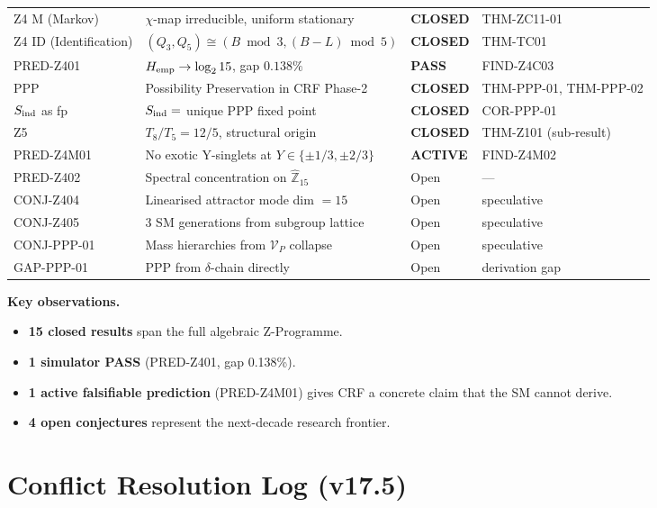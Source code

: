 \documentclass[12pt, a4paper]{article}
\begin{document}
\begin{keybox}[title={Master Z-Programme Status Table v17.5 (canonical)}]
{\begin{longtable}{p{2.6cm} p{6.0cm} p{1.6cm} p{3.2cm}}
Z4 M (Markov) & $\chi$-map irreducible, uniform stationary
   & \textbf{CLOSED} & THM-ZC11-01 \\
Z4 ID (Identification) & $(Q_3, Q_5) \cong (B \bmod 3, (B-L) \bmod 5)$
   & \textbf{CLOSED} & THM-TC01 \\
PRED-Z401 & $H_{\rm emp} \to \log_2 15$, gap $0.138\%$
   & \textbf{PASS} & FIND-Z4C03 \\
PPP & Possibility Preservation in CRF Phase-2
   & \textbf{CLOSED} & THM-PPP-01, THM-PPP-02 \\
$S_{\rm ind}$ as fp & $S_{\rm ind} =$ unique PPP fixed point
   & \textbf{CLOSED} & COR-PPP-01 \\
Z5 & $T_8/T_5 = 12/5$, structural origin
   & \textbf{CLOSED} & THM-Z101 (sub-result) \\
\midrule
PRED-Z4M01 & No exotic Y-singlets at $Y \in \{\pm 1/3, \pm 2/3\}$
   & \textbf{ACTIVE} & FIND-Z4M02 \\
PRED-Z402 & Spectral concentration on $\widehat{\mathbb{Z}}_{15}$
   & Open & --- \\
\midrule
CONJ-Z404 & Linearised attractor mode dim $= 15$
   & Open & speculative \\
CONJ-Z405 & 3 SM generations from subgroup lattice
   & Open & speculative \\
CONJ-PPP-01 & Mass hierarchies from $\mathcal{V}_P$ collapse
   & Open & speculative \\
GAP-PPP-01 & PPP from $\delta$-chain directly
   & Open & derivation gap \\
\bottomrule
\end{longtable}
}

\textbf{Key observations.}
\begin{itemize}[leftmargin=*, noitemsep]
  \item \textbf{15 closed results} span the full algebraic Z-Programme.
  \item \textbf{1 simulator PASS} (PRED-Z401, gap 0.138\%).
  \item \textbf{1 active falsifiable prediction} (PRED-Z4M01) gives
    CRF a concrete claim that the SM cannot derive.
  \item \textbf{4 open conjectures} represent the next-decade research
    frontier.
\end{itemize}
\end{keybox}

\section{Conflict Resolution Log (v17.5)}
\label{sec:conflict-log}
\end{document}
